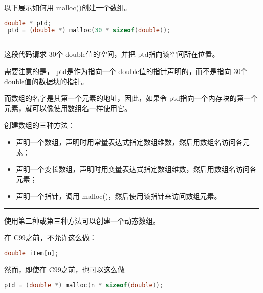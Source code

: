 \begin{frame}[fragile]\ft{\secname}
  以下展示如何用{ malloc()}创建一个数组。
 \begin{lstlisting}[language=c,backgroundcolor=\color{red!20}]
 double * ptd;
 ptd = (double *) malloc(30 * sizeof(double));
 \end{lstlisting}
\rule{\textwidth}{0.3mm} \pause \vspace{0.3mm}

这段代码请求{ 30}个{ double}值的空间，并把{ ptd}指向该空间所在位置。
\end{frame}

\begin{frame}[fragile]\ft{\secname}
  需要注意的是，{ ptd}是作为指向一个{ double}值的指针声明的，而不是指向{ 30}个{ double}值的数据块的指针。\vspace{0.2in}

  而数组的名字是其第一个元素的地址，因此，如果令{ ptd}指向一个内存块的第一个元素，就可以像使用数组名一样使用它。
\end{frame}

\begin{frame}[fragile]\ft{\secname}
  创建数组的三种方法：
  \begin{itemize}
  \item 声明一个数组，声明时用常量表达式指定数组维数，然后用数组名访问各元素；\\[0.1in]
  \item 声明一个变长数组，声明时用变量表达式指定数组维数，然后用数组名访问各元素；\\[0.1in]
  \item 声明一个指针，调用{ malloc()}，然后使用该指针来访问数组元素。
  \end{itemize}
  \rule{\textwidth}{0.3mm} \pause \vspace{0.3mm}

  使用第二种或第三种方法可以创建一个动态数组。
\end{frame}

\begin{frame}[fragile]\ft{\secname}
  在{ C99}之前，不允许这么做：
 \begin{lstlisting}[language=c,backgroundcolor=\color{red!20}]
 double item[n];
 \end{lstlisting} \vspace{0.1in}

 然而，即使在{ C99}之前，也可以这么做
 \begin{lstlisting}[language=c,backgroundcolor=\color{red!20}]
 ptd = (double *) malloc(n * sizeof(double));
 \end{lstlisting}  
\end{frame}


